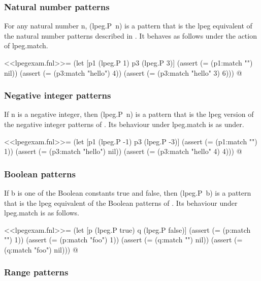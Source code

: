 \documentclass{article}
\begin{document}
\subsubsection{Natural number patterns}
\label{sec:ptcsj9xp}

For any natural number \textsf{n}, \textsf{(lpeg.P~n)} is a pattern
that is the \textsf{lpeg} equivalent of the natural number patterns
described in .  It behaves as follows under the
action of \textsf{lpeg.match}.
\begin{codechunk}
<<lpegexam.fnl>>=
(let [p1 (lpeg.P 1)
      p3 (lpeg.P 3)]
  (assert (= (p1:match "") nil))
  (assert (= (p3:match "hello") 4))
  (assert (= (p3:match "hello" 3) 6)))
@
\end{codechunk}

\subsubsection{Negative integer patterns}
\label{sec:owdg0noo}

If \textsf{n} is a negative integer, then \textsf{(lpeg.P~n)} is a
pattern that is the \textsf{lpeg} version of the negative integer
patterns of .  Its behaviour under
\textsf{lpeg.match} is as under.
\begin{codechunk}
<<lpegexam.fnl>>=
(let [p1 (lpeg.P -1)
      p3 (lpeg.P -3)]
  (assert (= (p1:match "") 1))
  (assert (= (p3:match "hello") nil))
  (assert (= (p3:match "hello" 4) 4)))
@
\end{codechunk}

\subsubsection{Boolean patterns}
\label{sec:pzx44una}

If \textsf{b} is one of the Boolean constants \textsf{true} and
\textsf{false}, then \textsf{(lpeg.P~b)} is a pattern that is the
\textsf{lpeg} equivalent of the Boolean patterns of
.  Its behaviour under \textsf{lpeg.match} is as
follows.
\begin{codechunk}
<<lpegexam.fnl>>=
(let [p (lpeg.P true)
      q (lpeg.P false)]
  (assert (= (p:match "") 1))
  (assert (= (p:match "foo") 1))
  (assert (= (q:match "") nil))
  (assert (= (q:match "foo") nil)))
@
\end{codechunk}

\subsubsection{Range patterns}
\label{sec:lodb4xcu}
\end{document}
